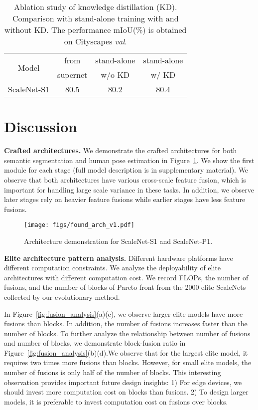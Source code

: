 \documentclass[final]{cvpr}
\newcommand{\netname}{ScaleNet\xspace}
\begin{document}
\begin{table}
\centering
\caption{Ablation study of knowledge distillation (KD). Comparison with stand-alone training with and without KD. The performance mIoU(\%) is obtained on Cityscapes \textit{val}.} 
\small
\begin{tabular}{c||c|c|c} 
\hline
\multirow{2}{*}{Model} & from  & stand-alone  & stand-alone  \\
 & supernet & w/o KD  & w/ KD  \\
\hline
\netname-S1 & 80.5 & 80.2  &  80.4  \\
\hline
\end{tabular}
\label{tab:ablation_standalone_training}
\end{table}

\label{sec:standalone_training}
 \section{Discussion}

\noindent\textbf{Crafted architectures.}
We demonstrate the crafted architectures for both semantic segmentation and human pose estimation in Figure~\ref{fig:found_arch}. We show the first module for each stage (full model description is in supplementary material). We observe that both architectures have various cross-scale feature fusion, which is important for handling large scale variance in these tasks. 
In addition, we observe later stages rely on heavier feature fusions while earlier stages have less feature fusions. 

\begin{figure}[t]
    \centering
    \texttt{[image: figs/found\_arch\_v1.pdf]}
    \caption{Architecture demonstration for ScaleNet-S1 and ScaleNet-P1. }
    \label{fig:found_arch}
\end{figure}

\noindent\textbf{Elite architecture pattern analysis.}
Different hardware platforms have different computation constraints. 
We analyze the deployability of elite architectures with different computation cost.
We record FLOPs, the number of fusions, and the number of blocks of Pareto front from  the 2000 elite ScaleNets collected by our evolutionary method. 

In Figure~\ref{fig:fusion_analysis}(a)(c), we observe larger elite models have more fusions than blocks. 
In addition, the number of fusions increases faster than the number of blocks. To further analyze the relationship between number of fusions and number of blocks, we demonstrate block-fusion ratio in Figure~\ref{fig:fusion_analysis}(b)(d).We observe that for the largest elite model, it requires two times more fusions than blocks. However, for small elite models, the number of fusions is only half of the number of blocks. 
This interesting observation provides important future design insights: 1) For edge devices, we should invest more computation cost on blocks than fusions. 2) To design larger models, it is preferable to invest computation cost on fusions over blocks.
\end{document}
